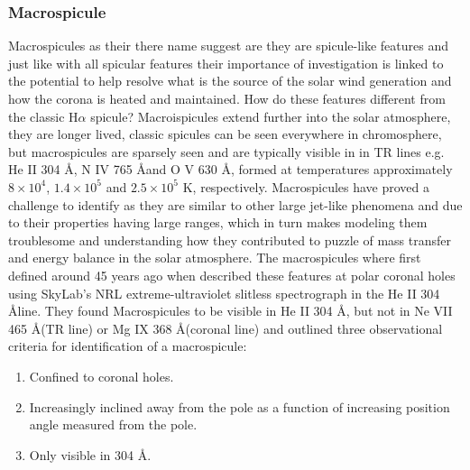 \documentclass[12pt]{ociamthesis}
\begin{document}
\subsubsection{Macrospicule}
\label{subsec:Mspic}
Macrospicules as their there name suggest are they are spicule-like features and just like with all spicular features their importance of investigation is linked to the potential to help resolve what is the source of the solar wind generation and how the corona is heated and maintained. How do these features different from the classic H$\alpha$ spicule? Macroispicules extend further into the solar atmosphere, they are longer lived, classic spicules can be seen everywhere in chromosphere, but macrospicules are sparsely seen and are typically visible in in TR lines e.g. He II 304 \AA, N IV 765 \AA and O V 630 \AA, formed at temperatures approximately $8\times10^4$, $1.4\times10^5$ and $2.5\times10^5$ K, respectively. Macrospicules have proved a challenge to identify as they are similar to other large jet-like phenomena and due to their properties having large ranges, which in turn makes modeling them troublesome and understanding how they contributed to puzzle of mass transfer and energy balance in the solar atmosphere. The macrospicules where first defined around 45 years ago when \cite{Bohlin1975ApJ197L133B} described these features at polar coronal holes using SkyLab's NRL extreme-ultraviolet slitless spectrograph in the He II 304 \AA  line. They found Macrospicules to be visible in He II 304 \AA, but not in Ne VII 465 \AA (TR line) or Mg IX 368 \AA (coronal line) and outlined three observational criteria for identification of a macrospicule:
\begin{enumerate}
\item Confined to coronal holes.
\item Increasingly inclined away from the pole as a function of increasing position angle measured from the pole.
\item Only visible in 304 \AA. 
\end{enumerate}
\end{document}
